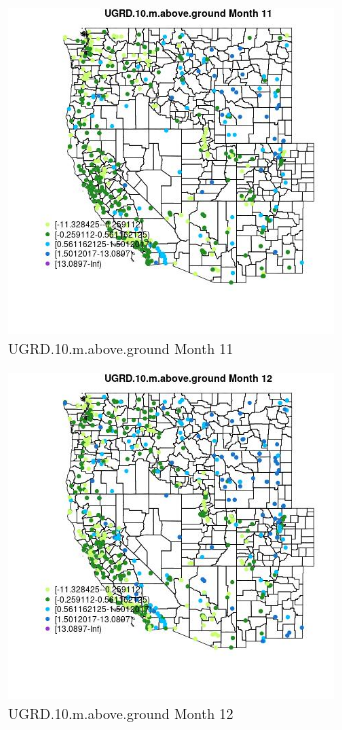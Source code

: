\begin{figure} 
\centering  
\includegraphics[width=0.77\textwidth]{Code_Outputs/Report_ML_input_PM25_Step4_part_e_de_duplicated_aves_compiled_2019-05-14wNAs_MapObsMo11UGRD10maboveground.jpg} 
\caption{\label{fig:Report_ML_input_PM25_Step4_part_e_de_duplicated_aves_compiled_2019-05-14wNAsMapObsMo11UGRD10maboveground}UGRD.10.m.above.ground Month 11} 
\end{figure} 
 

\begin{figure} 
\centering  
\includegraphics[width=0.77\textwidth]{Code_Outputs/Report_ML_input_PM25_Step4_part_e_de_duplicated_aves_compiled_2019-05-14wNAs_MapObsMo12UGRD10maboveground.jpg} 
\caption{\label{fig:Report_ML_input_PM25_Step4_part_e_de_duplicated_aves_compiled_2019-05-14wNAsMapObsMo12UGRD10maboveground}UGRD.10.m.above.ground Month 12} 
\end{figure} 
 

